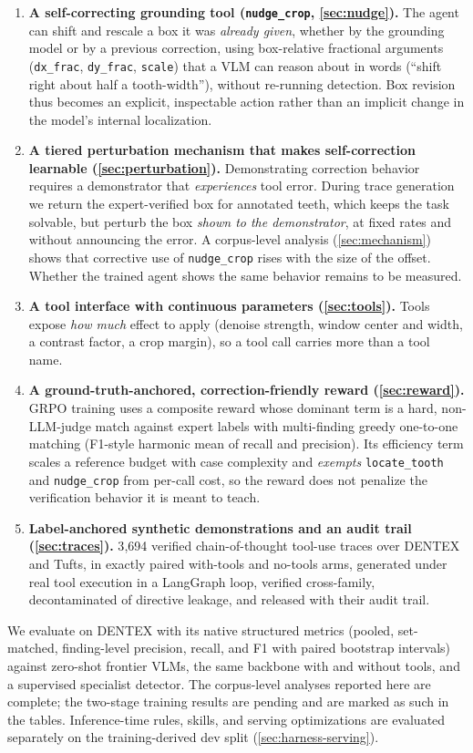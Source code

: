 \begin{enumerate}[leftmargin=*,itemsep=2pt,topsep=3pt]
\item \textbf{A self-correcting grounding tool (\texttt{nudge\_crop}, \cref{sec:nudge}).}
The agent can shift and rescale a box it was \emph{already given}, whether by the grounding
model or by a previous correction, using box-relative fractional arguments (\texttt{dx\_frac},
\texttt{dy\_frac}, \texttt{scale}) that a VLM can reason about in words (``shift right about
half a tooth-width''), without re-running detection. Box revision thus becomes an explicit,
inspectable action rather than an implicit change in the model's internal localization.
\item \textbf{A tiered perturbation mechanism that makes self-correction learnable
(\cref{sec:perturbation}).} Demonstrating correction behavior requires a demonstrator that
\emph{experiences} tool error. During trace generation we return the expert-verified box for
annotated teeth, which keeps the task solvable, but perturb the box \emph{shown to the
demonstrator}, at fixed rates and without announcing the error. A corpus-level analysis
(\cref{sec:mechanism}) shows that corrective use of \texttt{nudge\_crop} rises with the size of the
offset. Whether the trained agent shows the same behavior remains to be measured.
\item \textbf{A tool interface with continuous parameters (\cref{sec:tools}).} Tools expose
\emph{how much} effect to apply (denoise strength, window center and width, a contrast factor, a
crop margin), so a tool call carries more than a tool name.
\item \textbf{A ground-truth-anchored, correction-friendly reward (\cref{sec:reward}).} GRPO
training \citep{deepseek2025r1} uses a composite reward whose dominant term is a hard,
non-LLM-judge match against expert labels with multi-finding greedy one-to-one matching
(F1-style harmonic mean of recall and precision). Its efficiency term scales a reference
budget with case complexity and \emph{exempts} \texttt{locate\_tooth} and \texttt{nudge\_crop}
from per-call cost, so the reward does not penalize the verification behavior it is meant to
teach.
\item \textbf{Label-anchored synthetic demonstrations and an audit trail
(\cref{sec:traces}).} 3{,}694 verified chain-of-thought tool-use traces over DENTEX and Tufts, in
exactly paired with-tools and no-tools arms, generated under real tool execution in a
LangGraph \citep{langgraph} loop, verified cross-family, decontaminated of directive leakage, and released with
their audit trail.
\end{enumerate}

We evaluate on DENTEX with its native structured metrics (pooled, set-matched, finding-level
precision, recall, and F1 with paired bootstrap intervals) against zero-shot frontier VLMs, the
same backbone with and without tools, and a supervised specialist detector. The corpus-level
analyses reported here are complete; the two-stage training results are pending and are marked as such
in the tables. Inference-time rules, skills, and serving optimizations are evaluated separately on the
training-derived dev split (\cref{sec:harness-serving}).

